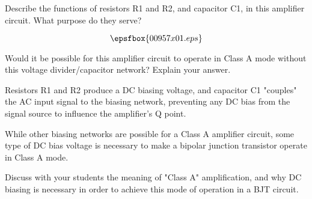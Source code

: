 

Describe the functions of resistors R1 and R2, and capacitor C1, in this amplifier circuit.  What purpose do they serve?

$$\epsfbox{00957x01.eps}$$

Would it be possible for this amplifier circuit to operate in Class A mode without this voltage divider/capacitor network?  Explain your answer.







Resistors R1 and R2 produce a DC biasing voltage, and capacitor C1 "couples" the AC input signal to the biasing network, preventing any DC bias from the signal source to influence the amplifier's Q point.

While other biasing networks are possible for a Class A amplifier circuit, some type of DC bias voltage is necessary to make a bipolar junction transistor operate in Class A mode.







Discuss with your students the meaning of "Class A" amplification, and why DC biasing is necessary in order to achieve this mode of operation in a BJT circuit.




